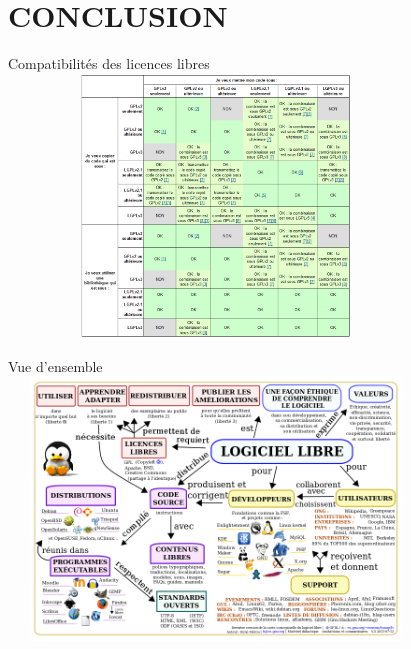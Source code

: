 \section{CONCLUSION}
\begin{frame}[t,fragile]{Compatibilités des licences libres}
    \centering \includegraphics[height=7cm, width=11cm]{matrice_compat}
\end{frame}

\begin{frame}{Vue d'ensemble}
    \centering
        \includegraphics[height=7cm, width=11cm]{schema-logiciel-libre}
\end{frame}


